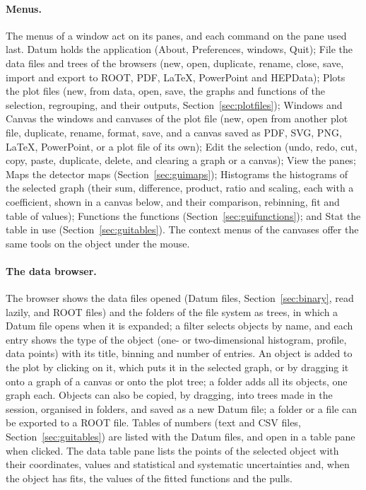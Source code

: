 \paragraph{Menus.}
The menus of a window act on its panes, and each command on the pane used last. Datum holds the application (About,
Preferences, windows, Quit); File the data files and trees of the browsers (new, open, duplicate, rename, close, save,
import and export to ROOT, PDF, \LaTeX{}, PowerPoint and HEPData); Plots the plot files (new, from data, open, save,
the graphs and functions of the selection, regrouping, and their outputs, Section~\ref{sec:plotfiles}); Windows and
Canvas the windows and canvases of the plot file (new, open from another plot file, duplicate, rename, format, save,
and a canvas saved as PDF, SVG, PNG, \LaTeX{}, PowerPoint, or a plot file of its own); Edit the selection (undo, redo,
cut, copy, paste, duplicate, delete, and clearing a graph or a canvas); View the panes; Maps the detector maps
(Section~\ref{sec:guimaps}); Histograms the histograms of the selected graph (their sum, difference, product, ratio
and scaling, each with a coefficient, shown in a canvas below, and their comparison, rebinning, fit and table of
values); Functions the functions (Section~\ref{sec:guifunctions}); and Stat the table in use
(Section~\ref{sec:guitables}). The context menus of the canvases offer the same tools on the object under the mouse.

\paragraph{The data browser.}
The browser shows the data files opened (Datum files, Section~\ref{sec:binary}, read lazily, and ROOT files) and the
folders of the file system as trees, in which a Datum file opens when it is expanded; a filter selects objects by name,
and each entry shows the type of the object (one- or two-dimensional histogram, profile, data points) with its title,
binning and number of entries. An object is added to the plot by clicking on it, which puts it in the selected graph,
or by dragging it onto a graph of a canvas or onto the plot tree; a folder adds all its objects, one graph each.
Objects can also be copied, by dragging, into trees made in the session, organised in folders, and saved as a new Datum
file; a folder or a file can be exported to a ROOT file. Tables of numbers (text and CSV files, Section~\ref{sec:guitables}) are listed with the Datum files, and open in a
table pane when clicked. The data table pane lists the points of the selected object
with their coordinates, values and statistical and systematic uncertainties and, when the object has fits, the values
of the fitted functions and the pulls.

